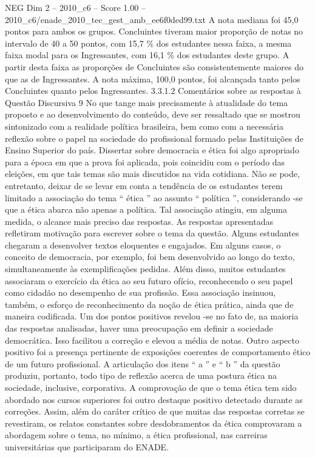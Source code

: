 \begin{textsample}{NEG Dim 2 – 2010\_c6 – Score 1.00 – 2010\_c6/enade\_2010\_tec\_gest\_amb\_ee6f0ded99.txt}
A nota mediana foi 45,0 pontos para ambos os grupos.
Concluintes tiveram maior proporção de notas no intervalo de 40 a 50 pontos, com 15,7 \% dos estudantes nessa faixa, a mesma faixa modal para os Ingressantes, com 16,1 \% dos estudantes deste grupo.
A partir desta faixa as proporções de Concluintes são consistentemente maiores do que as de Ingressantes.
A nota máxima, 100,0 pontos, foi alcançada tanto pelos Concluintes quanto pelos Ingressantes. 3.3.1.2 Comentários sobre as respostas à Questão Discursiva 9 No que tange mais precisamente à atualidade do tema proposto e ao desenvolvimento do conteúdo, deve ser ressaltado que se mostrou sintonizado com a realidade política brasileira, bem como com a necessária reflexão sobre o papel na sociedade do profissional formado pelas Instituições de Ensino Superior do país.
Dissertar sobre democracia e ética foi algo apropriado para a época em que a prova foi aplicada, pois coincidiu com o período das eleições, em que tais temas são mais discutidos na vida cotidiana.
Não se pode, entretanto, deixar de se levar em conta a tendência de os estudantes terem limitado a associação do tema “ ética ” ao assunto “ política ”, considerando -se que a ética abarca não apenas a política.
Tal associação atingiu, em alguma medida, o alcance mais preciso das respostas.
As respostas apresentadas refletiram motivação para escrever sobre o tema da questão.
Alguns estudantes chegaram a desenvolver textos eloquentes e engajados.
Em alguns casos, o conceito de democracia, por exemplo, foi bem desenvolvido ao longo do texto, simultaneamente às exemplificações pedidas.
Além disso, muitos estudantes associaram o exercício da ética ao seu futuro ofício, reconhecendo o seu papel como cidadão no desempenho de sua profissão.
Essa associação insinuou, também, o esforço de reconhecimento da noção de ética prática, ainda que de maneira codificada.
Um dos pontos positivos revelou -se no fato de, na maioria das respostas analisadas, haver uma preocupação em definir a sociedade democrática.
Isso facilitou a correção e elevou a média de notas.
Outro aspecto positivo foi a presença pertinente de exposições coerentes de comportamento ético de um futuro profissional.
A articulação dos itens “ a ” e “ b ” da questão produziu, portanto, todo tipo de reflexão acerca de uma postura ética na sociedade, inclusive, corporativa.
A comprovação de que o tema ética tem sido abordado nos cursos superiores foi outro destaque positivo detectado durante as correções.
Assim, além do caráter crítico de que muitas das respostas corretas se revestiram, os relatos constantes sobre desdobramentos da ética comprovaram a abordagem sobre o tema, no mínimo, a ética profissional, nas carreiras universitárias que participaram do ENADE.

\end{textsample}
